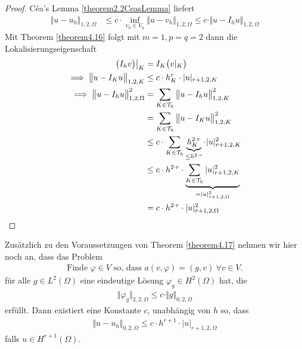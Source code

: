 \begin{proof}
	Céa's Lemma \ref{theorem2.2CeasLemma} liefert
	\begin{align*}
		\Vert u-u_h\Vert_{1,2,\Omega}&\leq c\cdot \inf\limits_{v_h\in V_h}\Vert u-v_h\Vert_{1,2,\Omega}
		\leq c\cdot\Vert u-I_h u\Vert_{1,2,\Omega}
	\end{align*}
	Mit Theorem \ref{theorem4.16} folgt mit $m=1,p=q=2$ dann die Lokalisierungseigenschaft
	\begin{align*}
		\big(I_h v\big)\big|_K&=I_K\big(v|_K\big)\\
		\implies
		\big\Vert u-I_K u\big\Vert_{1,2,K}&\leq c\cdot h_K^r\cdot|u|_{r+1,2,K}\\
		\implies
		\big\Vert u-I_h u\big\Vert^2_{1,2,\Omega}
		&=\sum\limits_{K\in\mathcal{T}_h}\big\Vert u-I_h u\big\Vert^2_{1,2,K}\\
		&=\sum\limits_{K\in\mathcal{T}_h}\big\Vert u-I_K u\big\Vert^2_{1,2,K}\\
		&\leq
		c\cdot\sum\limits_{K\in\mathcal{T}_h}\underbrace{h_K^{2\cdot r}}_{\leq h^{2\cdot r}}\cdot|u|^2_{r+1,2,K}\\
		&\leq c\cdot h^{2\cdot r}\cdot\underbrace{\sum\limits_{K\in\mathcal{T}_h}|u|^2_{r+1,2,K}}_{=|u|^2_{r+1,2,\Omega}}\\
		&=c\cdot h^{2\cdot r}\cdot|u|^2_{r+1,2,\Omega}
	\end{align*}
\end{proof}

\begin{theorem}\label{theorem4.18}
	Zusätzlich zu den Voraussetzungen von Theorem \ref{theorem4.17} nehmen wir hier noch an, dass das Problem
	\begin{align*}
		\text{Finde }\varphi\in V\text{ so, dass }a(v,\varphi)=(g,v)~\forall v\in V.
	\end{align*}
	für alle $g\in L^2(\Omega)$ eine eindeutige Lösung $\varphi_g\in H^2(\Omega)$ hat, die
	\begin{align*}
		\Vert\varphi_g\Vert_{2,2,\Omega}\leq c\cdot\Vert g\Vert_{0,2,\Omega}
	\end{align*}
	erfüllt. Dann existiert eine Konstante $c$, unabhängig von $h$ so, dass
	\begin{align*}
		\Vert u-u_h\Vert_{0,2,\Omega}\leq c\cdot h^{r+1}\cdot|u|_{r+1,2,\Omega}
	\end{align*}
	falls $u\in H^{r+1}(\Omega)$.
\end{theorem}

